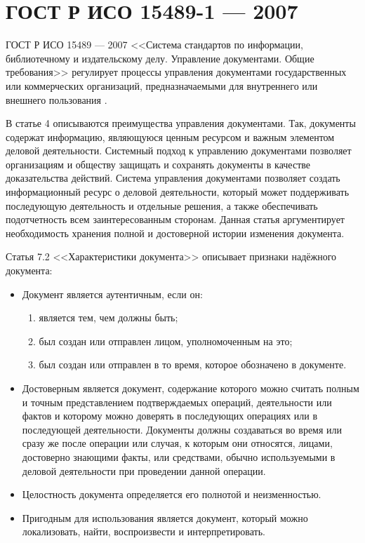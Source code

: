 \section{ГОСТ Р ИСО 15489-1 --- 2007} \label{rights_gost_15489_1}

ГОСТ Р ИСО 15489 --- 2007 <<Система стандартов по информации, библиотечному и издательскому делу. Управление документами. Общие требования>> регулирует процессы управления документами государственных или коммерческих организаций, предназначаемыми для внутреннего или внешнего пользования \cite{gost15489}.

В статье 4 описываются преимущества управления документами. Так, документы содержат информацию, являющуюся ценным ресурсом и важным элементом деловой деятельности. Системный подход к управлению документами позволяет организациям и обществу защищать и сохранять документы в качестве доказательства действий. Система управления документами позволяет создать информационный ресурс о деловой деятельности, который может поддерживать последующую деятельность и отдельные решения, а также обеспечивать подотчетность всем заинтересованным сторонам. Данная статья аргументирует необходимость хранения полной и достоверной истории изменения документа.

Статья 7.2 <<Характеристики документа>> описывает признаки надёжного документа:
\begin{itemize}
	\item Документ является аутентичным, если он:
	\begin{enumerate}
	\item является тем, чем должны быть;
	\item был создан или отправлен лицом, уполномоченным на это;
	\item был создан или отправлен в то время, которое обозначено в документе.
	\end{enumerate}
	\item Достоверным является документ, содержание которого можно считать полным и точным представлением подтверждаемых операций, деятельности или фактов и которому можно доверять в последующих операциях или в последующей деятельности. Документы должны создаваться во время или сразу же после операции или случая, к которым они относятся, лицами, достоверно знающими факты, или средствами, обычно используемыми в деловой деятельности при проведении данной операции.
	\item Целостность документа определяется его полнотой и неизменностью.
	\item Пригодным для использования является документ, который можно локализовать, найти, воспроизвести и интерпретировать.
\end{itemize}